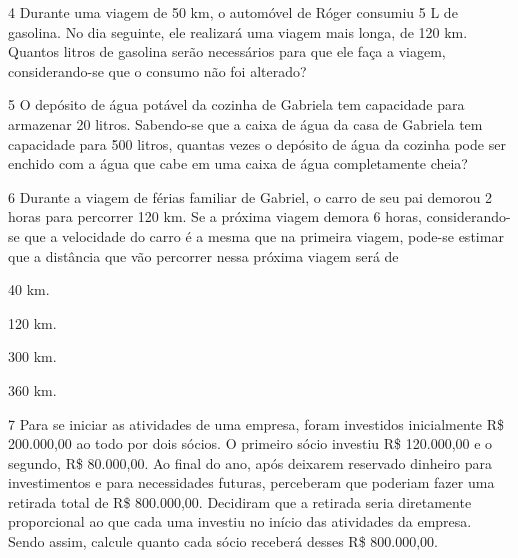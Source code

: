 \num{4} Durante uma viagem de 50 km, o automóvel de Róger consumiu 5 L de
gasolina. No dia seguinte, ele realizará uma viagem mais longa, de 120 km.
Quantos litros de gasolina serão necessários para que ele faça a viagem,
considerando-se que o consumo não foi alterado?

\begin{mdframed}[linewidth=2pt,linecolor=salmao,roundcorner=2pt]

\end{mdframed}



\num{5} O depósito de água potável da cozinha de Gabriela tem capacidade para
armazenar 20 litros. Sabendo-se que a caixa de água da casa de Gabriela
tem capacidade para 500 litros, quantas vezes o depósito de água da
cozinha pode ser enchido com a água que cabe em uma caixa de água
completamente cheia?

\begin{mdframed}[linewidth=2pt,linecolor=salmao,roundcorner=2pt]
\vspace{2cm}
\end{mdframed}


\num{6} Durante a viagem de férias familiar de Gabriel, o carro de seu pai
demorou 2 horas para percorrer 120 km. Se a próxima viagem demora 6
horas, considerando-se que a velocidade do carro é a mesma que na primeira
viagem, pode-se estimar que a distância que vão percorrer nessa próxima
viagem será de

\begin{minipage}{.5\textwidth}
\begin{escolha}
\item
  40 km.
\item
  120 km.
\item
  300 km.
\item
  360 km.
\end{escolha}
\end{minipage}

\num{7} Para se iniciar as atividades de uma empresa, foram investidos
inicialmente R\$ 200.000,00 ao todo por dois sócios. O primeiro
sócio investiu R\$ 120.000,00 e o segundo, R\$ 80.000,00. Ao final do ano,
após deixarem reservado dinheiro para investimentos e para necessidades
futuras, perceberam que poderiam fazer uma retirada total de R\$ 800.000,00. Decidiram que a retirada seria diretamente proporcional ao que
cada uma investiu no início das atividades da empresa. Sendo assim,
calcule quanto cada sócio receberá desses R\$ 800.000,00.

